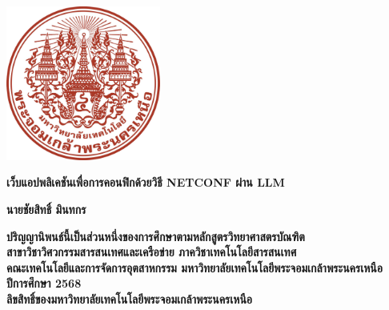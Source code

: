\newpage
\thispagestyle{empty}
\begin{center}

\includegraphics[width=5.08cm]{Image/Logo_KMUTNB_Thai.png}
\vspace{2mm}

{\bf
    เว็บแอปพลิเคชันเพื่อการคอนฟิกด้วยวิธี NETCONF ผ่าน LLM     %
}

\vspace{60mm}
{\bf
    นายชัยสิทธิ์ มินทกร %
}
\vspace{64mm}   






{\bf 
    ปริญญานิพนธ์นี้เป็นส่วนหนึ่งของการศึกษาตามหลักสูตรวิทยาศาสตรบัณฑิต\\
    สาขาวิชาวิศวกรรมสารสนเทศและเครือข่าย ภาควิชาเทคโนโลยีสารสนเทศ\\
    
    
    
    คณะเทคโนโลยีและการจัดการอุตสาหกรรม มหาวิทยาลัยเทคโนโลยีพระจอมเกล้าพระนครเหนือ    \\
    ปีการศึกษา 2568\\
    ลิขสิทธิ์ของมหาวิทยาลัยเทคโนโลยีพระจอมเกล้าพระนครเหนือ
}

\end{center}

